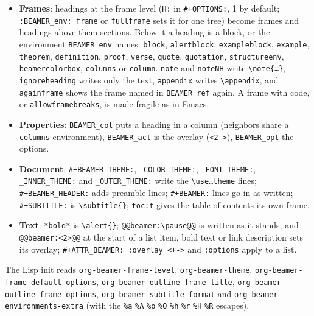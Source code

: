 \documentclass[11pt]{article}
\begin{document}
\begin{itemize}
\item \textbf{Frames}: headings at the frame level (\texttt{H:} in \texttt{\#+OPTIONS:}, 1 by default; \texttt{:BEAMER\_env: frame} or \texttt{fullframe} sets it for one tree) become frames and headings above them sections. Below it a heading is a block, or the environment \texttt{BEAMER\_env} names: \texttt{block}, \texttt{alertblock}, \texttt{exampleblock}, \texttt{example}, \texttt{theorem}, \texttt{definition}, \texttt{proof}, \texttt{verse}, \texttt{quote}, \texttt{quotation}, \texttt{structureenv}, \texttt{beamercolorbox}, \texttt{columns} or \texttt{column}. \texttt{note} and \texttt{noteNH} write \texttt{\textbackslash{}note\{…\}}, \texttt{ignoreheading} writes only the text, \texttt{appendix} writes \texttt{\textbackslash{}appendix}, and \texttt{againframe} shows the frame named in \texttt{BEAMER\_ref} again. A frame with code, or \texttt{allowframebreaks}, is made fragile as in Emacs.
\item \textbf{Properties}: \texttt{BEAMER\_col} puts a heading in a column (neighbors share a \texttt{columns} environment), \texttt{BEAMER\_act} is the overlay (\texttt{<2->}), \texttt{BEAMER\_opt} the options.
\item \textbf{Document}: \texttt{\#+BEAMER\_THEME:}, \texttt{\_COLOR\_THEME:}, \texttt{\_FONT\_THEME:}, \texttt{\_INNER\_THEME:} and \texttt{\_OUTER\_THEME:} write the \texttt{\textbackslash{}use…theme} lines; \texttt{\#+BEAMER\_HEADER:} adds preamble lines; \texttt{\#+BEAMER:} lines go in as written; \texttt{\#+SUBTITLE:} is \texttt{\textbackslash{}subtitle\{\}}; \texttt{toc:t} gives the table of contents its own frame.
\item \textbf{Text}: \texttt{*bold*} is \texttt{\textbackslash{}alert\{\}}; \texttt{@@beamer:\textbackslash{}pause@@} is written as it stands, and \texttt{@@beamer:<2>@@} at the start of a list item, bold text or link description sets its overlay; \texttt{\#+ATTR\_BEAMER: :overlay <+->} and \texttt{:options} apply to a list.
\end{itemize}

The Lisp init reads \texttt{org-beamer-frame-level}, \texttt{org-beamer-theme}, \texttt{org-beamer-frame-default-options}, \texttt{org-beamer-outline-frame-title}, \texttt{org-beamer-outline-frame-options}, \texttt{org-beamer-subtitle-format} and \texttt{org-beamer-environments-extra} (with the \texttt{\%a} \texttt{\%A} \texttt{\%o} \texttt{\%O} \texttt{\%h} \texttt{\%r} \texttt{\%H} \texttt{\%R} escapes).
\end{document}
